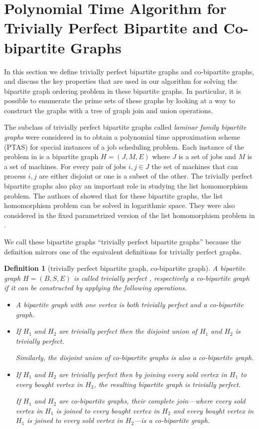 \documentclass[letterpaper,11pt,abstracton]{scrartcl}
\newtheorem{dfn}[theorem]{Definition}
\begin{document}
\section{Polynomial Time Algorithm for Trivially Perfect Bipartite and Co-bipartite Graphs}\label{sec:poly-TP-CB}

In this section we define trivially perfect bipartite graphs and co-bipartite graphs,
and discuss the key properties that are used in our algorithm for solving
the bipartite graph ordering problem in these bipartite graphs.  In particular, it is
possible to enumerate the prime sets of these graphs by looking at a way
to construct the graphs with a tree of graph join and union operations.

The subclass of trivially perfect bipartite graphs called {\em laminar family bipartite graphs} were considered in \cite{MSW10} to obtain a
polynomial time approximation
scheme (PTAS) for special instances of a job scheduling problem. Each instance of the problem in \cite{MSW10} is a bipartite graph
$H=(J,M,E)$ where $J$ is a set of jobs and $M$ is a set of machines. For every pair of jobs $i,j \in J$ the set of machines that can process
$i,j$ are either disjoint or one is a subset of the other. The trivially perfect bipartite graphs also play an important role in
studying the list homomorphism problem. The authors of \cite{EKLT12} showed that for these
bipartite graphs, the list homomorphism problem can be
solved in logarithmic space. They were also considered in the fixed parametrized version of the list homomorphism problem
in \cite{CEM13}.

We call these bipartite graphs ``trivially perfect
bipartite graphs'' because the definition mirrors one of the equivalent
definitions for trivially perfect graphs.

\begin{dfn}[trivially perfect bipartite graph, co-bipartite graph]
  \label{def:tp}
  A bipartite graph $H=(B,S,E)$ is called \emph{trivially perfect} , respectively
  a \emph{co-bipartite graph} if it can be constructed by applying the
  following operations.
  \begin{itemize}

  \item A bipartite graph with one vertex is both trivially perfect and a co-bipartite graph.
  \item If $H_1$ and $H_2$ are trivially perfect then the disjoint union of $H_1$ and $H_2$ is trivially perfect.

    Similarly, the disjoint union of co-bipartite graphs is also a co-bipartite graph.
  \item If $H_1$ and $H_2$ are trivially perfect then by joining
every sold vertex in $H_1$ to every bought vertex in $H_2$, the resulting bipartite graph is trivially
    perfect.

    If $H_1$ and $H_2$ are co-bipartite graphs, their \emph{complete} join---where every sold
    vertex in $H_1$ is joined to every bought vertex in $H_2$ and every bought vertex in $H_1$ is
    joined to every sold vertex in $H_2$---is a
    co-bipartite graph.
  \end{itemize}
\end{dfn}
\end{document}
